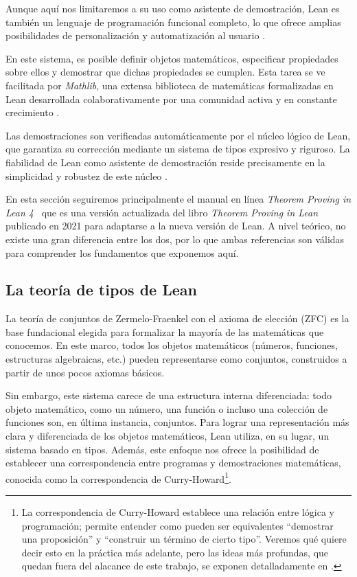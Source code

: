 \documentclass{article}
\newcommand{\quotes}[1]{``#1''}
\begin{document}
Aunque aquí nos limitaremos a su uso como asistente de demostración, Lean es también un lenguaje de programación funcional completo, lo que ofrece amplias posibilidades de personalización y automatización al usuario \cite[Sección~1]{avigad2024theorem}.

En este sistema, es posible definir objetos matemáticos, especificar propiedades sobre ellos y demostrar que dichas propiedades se cumplen. Esta tarea se ve facilitada por \textit{Mathlib}, una extensa biblioteca de matemáticas formalizadas en Lean desarrollada colaborativamente por una comunidad activa y en constante crecimiento \cite{mathlib}.

Las demostraciones son verificadas automáticamente por el núcleo lógico de Lean, que garantiza su corrección mediante un sistema de tipos expresivo y riguroso. La fiabilidad de Lean como asistente de demostración reside precisamente en la simplicidad y robustez de este núcleo \cite{bailey2024type}.

En esta sección seguiremos principalmente el manual en línea \textit{Theorem Proving in Lean 4}~\cite{avigad2024theorem} que es una versión actualizada del libro \textit{Theorem Proving in Lean}~\cite{avigad2021theorem} publicado en 2021 para adaptarse a la nueva versión de Lean. A nivel teórico, no existe una gran diferencia entre los dos, por lo que ambas referencias son válidas para comprender los fundamentos que exponemos aquí.


\subsection{La teoría de tipos de Lean}

La teoría de conjuntos de Zermelo-Fraenkel con el axioma de elección (ZFC) es la base fundacional elegida para formalizar la mayoría de las matemáticas que conocemos. En este marco, todos los objetos matemáticos (números, funciones, estructuras algebraicas, etc.) pueden representarse como conjuntos, construidos a partir de unos pocos axiomas básicos.

Sin embargo, este sistema carece de una estructura interna diferenciada: todo objeto matemático, como un número, una función o incluso una colección de funciones son, en última instancia, conjuntos. Para lograr una representación más clara y diferenciada de los objetos matemáticos, Lean utiliza, en su lugar, un sistema basado en tipos. Además, este enfoque nos ofrece la posibilidad de establecer una correspondencia entre programas y demostraciones matemáticas, conocida como la correspondencia de Curry-Howard\footnote{La correspondencia de Curry-Howard establece una relación entre lógica y programación; permite entender como pueden ser equivalentes \quotes{demostrar una proposición} y \quotes{construir un término de cierto tipo}. Veremos qué quiere decir esto en la práctica más adelante, pero las ideas más profundas, que quedan fuera del alacance de este trabajo, se exponen detalladamente en \cite{sorensen2006lectures}.}.
\end{document}
